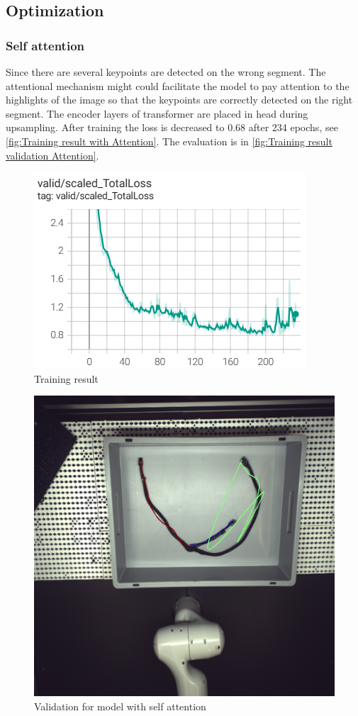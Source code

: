 \subsection{Optimization}
\subsubsection{Self attention}
	Since there are several keypoints are detected on the wrong segment. The attentional mechanism might could facilitate the model to pay attention 
	to the highlights of the image so that the keypoints are correctly detected on the right segment. The encoder layers of transformer are placed in 
	head during upsampling. After training the loss is decreased to 0.68 after 234 epochs, see \autoref{fig:Training result with Attention}. 
	The evaluation is in \autoref{fig:Training result validation Attention}.\\
	\begin{figure}
		\centering
		\includegraphics[width=0.6\linewidth]{example_images/withAttn_keypoints_100}
		\caption{Training result}
		\label{fig:Training result with Attention}
	\end{figure}
	\begin{figure}
		\centering
		\includegraphics[width=0.6\linewidth]{example_images/keypoints_100_eval_withAttn}
		\caption{Validation for model with self attention}
		\label{fig:Training result validation Attention}
	\end{figure}
